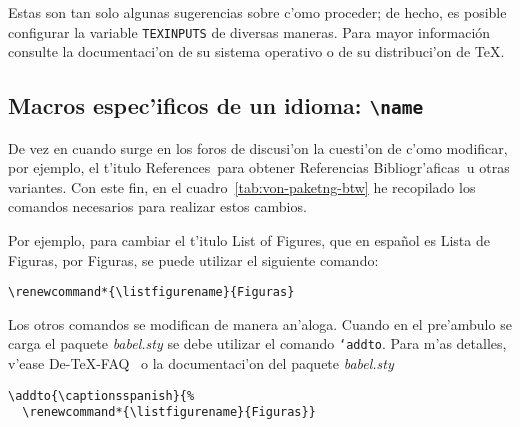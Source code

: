 \documentclass[11pt,a4paper,pagesize,tablecaptionabove,abstracton,pointlessnumbers]{scrartcl}
\newcommand{\gl}{\guillemotleft}
\newcommand{\gr}{\guillemotright}
\newcommand{\Doku}[1]{\textsf{#1}\xspace}
\newcommand{\Paket}[1]{\textsf{\textsl{#1.sty}}\xspace}
\DeclareRobustCommand*{\Macro}[1]{\mbox{\texttt{\char`\\#1}}}
\begin{document}
Estas son tan solo algunas sugerencias sobre c'omo proceder; de hecho, es posible configurar la variable \texttt{TEXINPUTS} de diversas maneras. Para mayor información consulte la documentaci'on de su sistema operativo o de su distribuci'on de \TeX.

\subsection{Macros espec'ificos de un idioma: \texttt{\textbackslash*name}}
\label{sec:die-macroname-makros}

De vez en cuando surge en los foros de discusi'on la cuesti'on de c'omo modificar, por ejemplo, el t'itulo \gl References\gr\ para obtener \gl Referencias Bibliogr'aficas\gr\ u otras variantes. Con este fin, en el cuadro~\vref{tab:von-paketng-btw} he recopilado los comandos necesarios para realizar estos cambios.

Por ejemplo, para cambiar el t'itulo \gl List of Figures\gr, que en español es \gl Lista de Figuras\gr, por \gl Figuras\gr, se puede utilizar el siguiente comando:
\begin{verbatim}
\renewcommand*{\listfigurename}{Figuras}
\end{verbatim}
Los otros comandos se modifican de manera an'aloga. Cuando en el pre'ambulo se carga el paquete \Paket{babel} se debe utilizar el comando \Macro{addto}. Para m'as detalles, v'ease \Doku{De-TeX-FAQ}~\cite{faq:02} o la documentaci'on del paquete \Paket{babel}

\begin{verbatim}
\addto{\captionsspanish}{%
  \renewcommand*{\listfigurename}{Figuras}}
\end{verbatim} 
\end{document}
